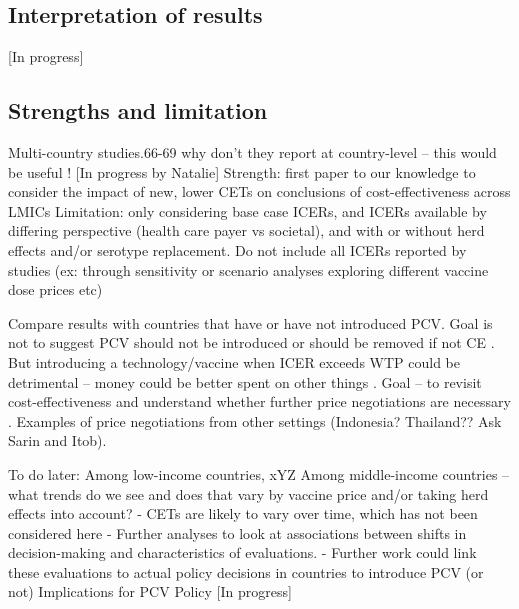 \documentclass[12pt]{article}
\begin{document}
\subsection*{Interpretation of results}
[In progress]

\subsection*{Strengths and limitation}
Multi-country studies.66-69 why don't they report at country-level – this would be useful !
[In progress by Natalie]
Strength: first paper to our knowledge to consider the impact of new, lower CETs on conclusions of cost-effectiveness across LMICs
Limitation: only considering base case ICERs, and ICERs available by differing perspective (health care payer vs societal), and with or without herd effects and/or serotype replacement.
Do not include all ICERs reported by studies (ex: through sensitivity or scenario analyses exploring different vaccine dose prices etc)

Compare results with countries that have or have not introduced PCV. Goal is not to suggest PCV should not be introduced or should be removed if not CE . But introducing a technology/vaccine when ICER exceeds WTP could be detrimental – money could be better spent on other things .
Goal – to revisit cost-effectiveness and understand whether further price negotiations are necessary . Examples of price negotiations from other settings (Indonesia? Thailand?? Ask Sarin and Itob). 

To do later:
Among low-income countries, xYZ 
Among middle-income countries – what trends do we see and does that vary by vaccine price and/or taking herd effects into account?
-	CETs are likely to vary over time, which has not been considered here
-	Further analyses to look at associations between shifts in decision-making and characteristics of evaluations.
-	Further work could link these evaluations to actual policy decisions in countries to introduce PCV (or not)
Implications for PCV Policy
[In progress]





\clearpage
\newrefcontext[sorting=nyt]
\printbibliography
\end{document}
